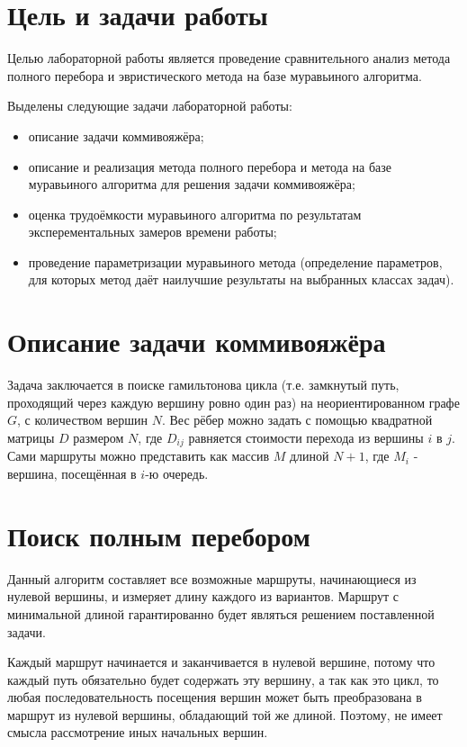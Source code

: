 \section{Цель и задачи работы}
Целью лабораторной работы является проведение сравнительного анализ метода полного перебора и эвристического метода на базе муравьиного алгоритма.

Выделены следующие задачи лабораторной работы:

\begin{itemize}
\item описание задачи коммивояжёра;
\item описание и реализация метода полного перебора и метода на базе муравьиного алгоритма для решения задачи коммивояжёра;
\item оценка трудоёмкости муравьиного алгоритма по результатам эксперементальных замеров времени работы;
\item проведение параметризации муравьиного метода (определение параметров, для которых метод даёт наилучшие результаты на выбранных классах задач).
\end{itemize}

\section{Описание задачи коммивояжёра}
Задача заключается в поиске гамильтонова цикла (т.е. замкнутый путь, проходящий через каждую вершину ровно один раз) на неориентированном графе $G$, с количеством вершин $N$\cite{Corman}. Вес рёбер можно задать с помощью квадратной матрицы $D$ размером $N$, где $D_{ij}$ равняется стоимости перехода из вершины $i$ в $j$. Сами маршруты можно представить как массив $M$ длиной $N+1$, где $M_{i}$ - вершина, посещённая в $i$-ю очередь.

\section{Поиск полным перебором}
Данный алгоритм составляет все возможные маршруты, начинающиеся из нулевой вершины, и измеряет длину каждого из вариантов. Маршрут с минимальной длиной гарантированно будет являться решением поставленной задачи. 

Каждый маршрут начинается и заканчивается в нулевой вершине, потому что каждый путь обязательно будет содержать эту вершину, а так как это цикл, то любая последовательность посещения вершин может быть преобразована в маршрут из нулевой вершины, обладающий той же длиной. Поэтому, не имеет смысла рассмотрение иных начальных вершин.

